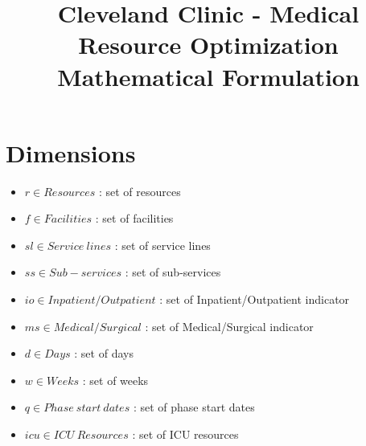 \documentclass[10pt, letterpaper]{article}
\begin{document}
\title{Cleveland Clinic - Medical Resource Optimization Mathematical Formulation}
\maketitle

\section*{Dimensions}
\begin{itemize}
\item[ ] $ r \in Resources$ : set of resources
\item[ ] $ f \in Facilities$ : set of facilities
\item[ ] $ sl \in Service \ lines$ : set of service lines
\item[ ] $ ss \in Sub-services$ : set of sub-services
\item[ ] $ io \in Inpatient/Outpatient$ : set of Inpatient/Outpatient indicator
\item[ ] $ ms \in Medical/Surgical$ : set of Medical/Surgical indicator
\item[ ] $ d \in Days$ : set of days
\item[ ] $ w \in Weeks$ : set of weeks
\item[ ] $ q \in Phase \ start \ dates$ : set of phase start dates
\item[ ] $ icu \in ICU \ Resources$ : set of ICU resources
\end{itemize}
\end{document}
